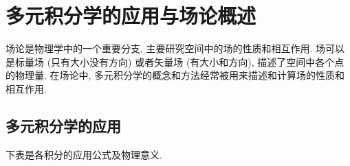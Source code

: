 \section{多元积分学的应用与场论概述}

场论是物理学中的一个重要分支, 主要研究空间中的场的性质和相互作用. 
场可以是标量场 (只有大小没有方向) 或者矢量场 (有大小和方向), 描述了空间中各个点的物理量. 
在场论中, 多元积分学的概念和方法经常被用来描述和计算场的性质和相互作用. 

\subsection{多元积分学的应用}

下表是各积分的应用公式及物理意义.
\setcounter{magicrownumbers}{0}
\begin{table}[H]
    \centering
    \caption{各积分的应用公式及物理意义}
\end{table}
